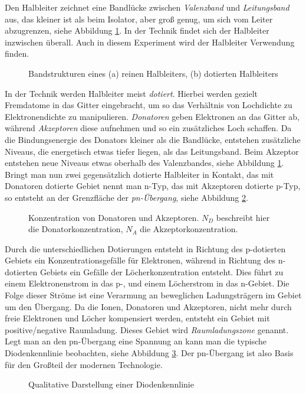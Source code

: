 Den Halbleiter zeichnet eine Bandlücke zwischen \emph{Valenzband} und 
\emph{Leitungsband} aus, das kleiner ist als beim Isolator, aber groß genug,
um sich vom Leiter abzugrenzen, siehe Abbildung \ref{abb:band}.
In der Technik findet sich der Halbleiter inzwischen überall.
Auch in diesem Experiment wird der Halbleiter Verwendung finden.
\begin{figure}[h]
  \begin{subfigure}{0.3\textwidth}
    
  \end{subfigure}
  \begin{subfigure}{0.7\textwidth}
    
  \end{subfigure}
  \caption{Bandstrukturen eines (a) reinen Halbleiters, (b) dotierten Halbleiters}
  \label{abb:band}
\end{figure}
In der Technik werden Halbleiter meist \emph{dotiert}. Hierbei werden gezielt 
Fremdatome in das Gitter eingebracht, um so das Verhältnis von Lochdichte zu
Elektronendichte zu manipulieren. \emph{Donatoren} geben Elektronen an das Gitter 
ab, während \emph{Akzeptoren} diese aufnehmen und so ein zusätzliches Loch 
schaffen. Da die Bindungsenergie des Donators kleiner als die Bandlücke, entstehen
zusätzliche Niveaus, die energetisch etwas tiefer liegen, als das Leitungsband.
Beim Akzeptor entstehen neue Niveaus etwas oberhalb des Valenzbandes, siehe 
Abbildung \ref{abb:band}.
Bringt man nun zwei gegensätzlich dotierte Halbleiter in Kontakt, das mit Donatoren
dotierte Gebiet nennt man n-Typ, das mit Akzeptoren dotierte p-Typ, so entsteht an
der Grenzfläche der \emph{pn-Übergang}, siehe Abbildung \ref{abb:pn}.
\begin{figure}[h]
  \centering
  
  \caption{Konzentration von Donatoren und Akzeptoren. $N_D$ beschreibt hier die
           Donatorkonzentration, $N_A$ die Akzeptorkonzentration.}
  \label{abb:pn}
\end{figure}
Durch die unterschiedlichen Dotierungen entsteht in Richtung des p-dotierten Gebiets
ein Konzentrationsgefälle für Elektronen, während in Richtung des n-dotierten 
Gebiets ein Gefälle der Löcherkonzentration entsteht. Dies führt zu einem
Elektronenstrom in das p-, und einem Löcherstrom in das n-Gebiet. Die Folge dieser
Ströme ist eine Verarmung an beweglichen Ladungsträgern im Gebiet um den 
Übergang. Da die Ionen, Donatoren und Akzeptoren, nicht mehr durch freie Elektronen
und Löcher kompensiert werden, entsteht ein Gebiet mit positive/negative 
Raumladung. Dieses Gebiet wird \emph{Raumladungszone} genannt. Legt man an den
pn-Übergang eine Spannung an kann man die typische Diodenkennlinie beobachten,
siehe Abbildung \ref{abb:diodui}.
Der pn-Übergang ist also Basis für den Großteil der modernen Technologie.
\begin{figure}
  \centering
  \caption{Qualitative Darstellung einer Diodenkennlinie \autocite{wiki:diode}}
  \label{abb:diodui}
\end{figure}

